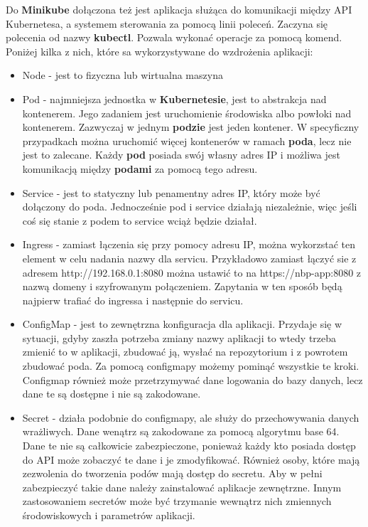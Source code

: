 \documentclass{iiuwb}
\begin{document}
Do \textbf{Minikube} dołączona też jest aplikacja
służąca do komunikacji między API Kubernetesa, a systemem 
sterowania za pomocą linii poleceń. Zaczyna się polecenia
od nazwy \textbf{kubectl}. Pozwala wykonać operacje 
za pomocą komend. Poniżej kilka z nich, które sa 
wykorzystywane do wzdrożenia aplikacji:

\begin{itemize}
  \item Node - jest to fizyczna lub wirtualna maszyna

  \item Pod - najmniejsza jednostka w \textbf{Kubernetesie},
  jest to abstrakcja nad kontenerem. Jego zadaniem jest
  uruchomienie środowiska albo powłoki nad kontenerem. 
  Zazwyczaj w jednym \textbf{podzie} jest jeden kontener.
  W specyficzny przypadkach można uruchomić więcej kontenerów
  w ramach \textbf{poda}, lecz nie jest to zalecane. Każdy 
  \textbf{pod} posiada swój własny adres IP i możliwa jest
  komunikacją między \textbf{podami} za pomocą tego adresu.
  
  \item Service - jest to statyczny lub penamentny adres IP,
  który może być dołączony do poda. Jednocześnie pod i service
  działają niezależnie, więc jeśli coś się stanie z podem to
  service wciąż będzie działał.
  
  \item Ingress - zamiast łączenia się przy pomocy adresu IP,
  można wykorzstać ten element w celu nadania nazwy dla servicu.
  Przykładowo zamiast łączyć sie z adresem http://192.168.0.1:8080
  można ustawić to na https://nbp-app:8080 z nazwą domeny 
  i szyfrowanym połączeniem. Zapytania w ten sposób będą 
  najpierw trafiać do ingressa i następnie do servicu. 

  \item ConfigMap - jest to zewnętrzna konfiguracja dla aplikacji.
   Przydaje się w sytuacji, gdyby zaszła potrzeba zmiany nazwy 
   aplikacji to wtedy trzeba zmienić to w aplikacji, zbudować 
   ją, wysłać na repozytorium i z powrotem zbudować poda. 
   Za pomocą configmapy możemy pominąć wszystkie te kroki. 
   Configmap również może przetrzymywać dane logowania do bazy 
   danych, lecz dane te są dostępne i nie są zakodowane.

  \item Secret - działa podobnie do configmapy, ale służy do 
  przechowywania danych wrażliwych. Dane wenątrz są zakodowane 
  za pomocą algorytmu base 64. Dane te nie są całkowicie 
  zabezpieczone, ponieważ każdy kto posiada dostęp do API może
  zobaczyć te dane i je zmodyfikować. Również osoby, które mają
  zezwolenia do tworzenia podów mają dostęp do secretu. 
  Aby w pełni zabezpieczyć takie dane należy zainstalować aplikacje
  zewnętrzne. Innym zastosowaniem secretów może być trzymanie 
  wewnątrz nich zmiennych środowiskowych i parametrów aplikacji.


\end{itemize}
\end{document}
